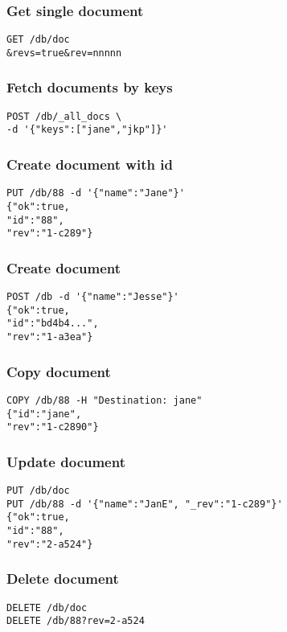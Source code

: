 \subsubsection{Get single document}
\begin{lstlisting}
GET /db/doc
&revs=true&rev=nnnnn
\end{lstlisting}

\subsubsection{Fetch documents by keys}
\begin{lstlisting}
POST /db/_all_docs \
-d '{"keys":["jane","jkp"]}'
\end{lstlisting}

\subsubsection{Create document with id}
\begin{lstlisting}
PUT /db/88 -d '{"name":"Jane"}'
{"ok":true,
"id":"88",
"rev":"1-c289"}
\end{lstlisting}

\subsubsection{Create document}
\begin{lstlisting}
POST /db -d '{"name":"Jesse"}' 
{"ok":true,
"id":"bd4b4...",
"rev":"1-a3ea"}
\end{lstlisting}

\subsubsection{Copy document}
\begin{lstlisting}
COPY /db/88 -H "Destination: jane" 
{"id":"jane",
"rev":"1-c2890"}
\end{lstlisting}

\subsubsection{Update document}
\begin{lstlisting}
PUT /db/doc
PUT /db/88 -d '{"name":"JanE", "_rev":"1-c289"}'
{"ok":true,
"id":"88",
"rev":"2-a524"}
\end{lstlisting}

\subsubsection{Delete document}
\begin{lstlisting}
DELETE /db/doc
DELETE /db/88?rev=2-a524
\end{lstlisting}

